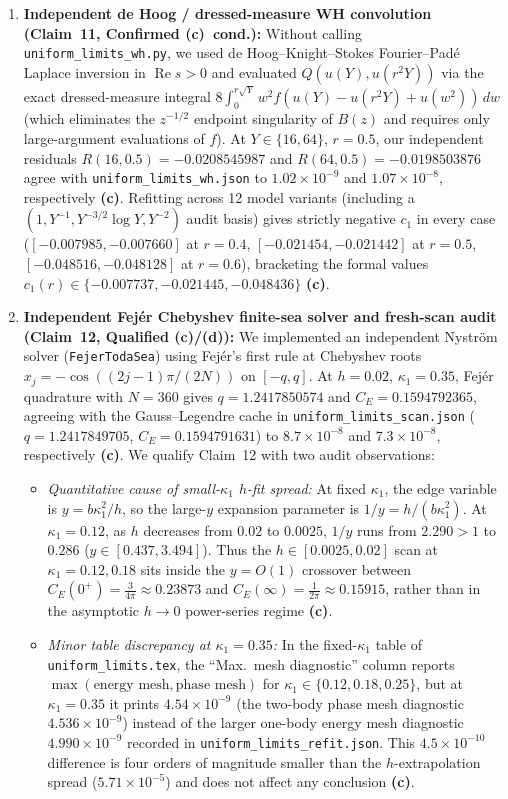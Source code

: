 \documentclass[11pt,a4paper]{article}
\newcommand{\C}{\textbf{(c)}}
\newcommand{\D}{\textbf{(d)}}
\newcommand{\scr}[1]{\texttt{#1}}
\begin{document}
\begin{enumerate}
\item \textbf{Independent de Hoog / dressed-measure WH convolution (Claim~11, Confirmed \C\ cond.):}
Without calling \scr{uniform\_limits\_wh.py}, we used de Hoog--Knight--Stokes
Fourier--Pad\'e Laplace inversion in $\operatorname{Re}s>0$ and evaluated
$Q(u(Y),u(r^2Y))$ via the exact dressed-measure integral
$8\int_0^{r\sqrt{Y}}w^2 f(u(Y)-u(r^2Y)+u(w^2))\,dw$ (which eliminates the
$z^{-1/2}$ endpoint singularity of $B(z)$ and requires only large-argument
evaluations of $f$). At $Y\in\{16,64\}$, $r=0.5$, our independent residuals
$R(16,0.5)=-0.0208545987$ and $R(64,0.5)=-0.0198503876$
agree with \scr{uniform\_limits\_wh.json} to $1.02\times 10^{-9}$ and
$1.07\times 10^{-8}$, respectively \C. Refitting across 12 model variants
(including a $(1,Y^{-1},Y^{-3/2}\log Y,Y^{-2})$ audit basis) gives strictly
negative $c_1$ in every case ($[-0.007985,-0.007660]$ at $r=0.4$,
$[-0.021454,-0.021442]$ at $r=0.5$, $[-0.048516,-0.048128]$ at $r=0.6$),
bracketing the formal values $c_1(r)\in\{-0.007737,-0.021445,-0.048436\}$ \C.

\item \textbf{Independent Fej\'er Chebyshev finite-sea solver and fresh-scan audit (Claim~12, Qualified \C/\D):}
We implemented an independent Nystr\"om solver (\texttt{FejerTodaSea}) using
Fej\'er's first rule at Chebyshev roots $x_j=-\cos((2j-1)\pi/(2N))$ on $[-q,q]$.
At $h=0.02$, $\kappa_1=0.35$, Fej\'er quadrature with $N=360$ gives
$q=1.2417850574$ and $C_E=0.1594792365$, agreeing with the Gauss--Legendre cache in
\scr{uniform\_limits\_scan.json} ($q=1.2417849705$, $C_E=0.1594791631$) to $8.7\times 10^{-8}$ and
$7.3\times 10^{-8}$, respectively \C.
We qualify Claim~12 with two audit observations:
\begin{itemize}
\item \emph{Quantitative cause of small-$\kappa_1$ $h$-fit spread:} At fixed
$\kappa_1$, the edge variable is $y=b\kappa_1^2/h$, so the large-$y$ expansion
parameter is $1/y=h/(b\kappa_1^2)$. At $\kappa_1=0.12$, as $h$ decreases from
$0.02$ to $0.0025$, $1/y$ runs from $2.290>1$ to $0.286$ ($y\in[0.437,3.494]$).
Thus the $h\in[0.0025,0.02]$ scan at $\kappa_1=0.12,0.18$ sits inside the
$y=O(1)$ crossover between $C_E(0^+)=\frac{3}{4\pi}\approx 0.23873$ and
$C_E(\infty)=\frac{1}{2\pi}\approx 0.15915$, rather than in the asymptotic
$h\to 0$ power-series regime \C.
\item \emph{Minor table discrepancy at $\kappa_1=0.35$:} In the fixed-$\kappa_1$
table of \scr{uniform\_limits.tex}, the ``Max.\ mesh diagnostic'' column reports
$\max(\text{energy mesh},\text{phase mesh})$ for $\kappa_1\in\{0.12,0.18,0.25\}$,
but at $\kappa_1=0.35$ it prints $4.54\times 10^{-9}$ (the two-body phase mesh
diagnostic $4.536\times 10^{-9}$) instead of the larger one-body energy mesh
diagnostic $4.990\times 10^{-9}$ recorded in \scr{uniform\_limits\_refit.json}.
This $4.5\times 10^{-10}$ difference is four orders of magnitude smaller than the
$h$-extrapolation spread ($5.71\times 10^{-5}$) and does not affect any
conclusion \C.
\end{itemize}
\end{enumerate}
\end{document}
